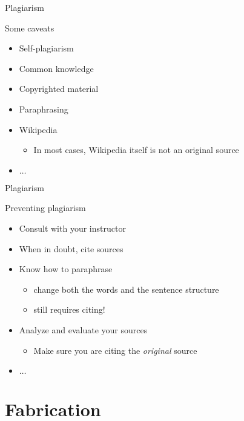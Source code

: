 	\begin{frame}{Plagiarism}
		
		Some caveats

		\begin{itemize}
			\item 
				Self-plagiarism
			\item 
				Common knowledge
			\item 
				Copyrighted material
			\item 
				Paraphrasing
			\item 
				Wikipedia
				\begin{itemize}
					\item 
						In most cases, Wikipedia itself is not an original source
				\end{itemize}
			\item 
				$\ldots$
		\end{itemize}

	\end{frame}

	\begin{frame}{Plagiarism}
		
		Preventing plagiarism

		\begin{itemize}
			\item 
				Consult with your instructor
			\item 
				When in doubt, cite sources
			\item 
				Know how to paraphrase
				\begin{itemize}
					\item 
						change both the words and the sentence structure
					\item 
						still requires citing!
				\end{itemize}
			\item 
				Analyze and evaluate your sources
				\begin{itemize}
					\item 
						Make sure you are citing the \emph{original} source
				\end{itemize}
			\item 
				$\ldots$
		\end{itemize}

	\end{frame}

\section{Fabrication}

